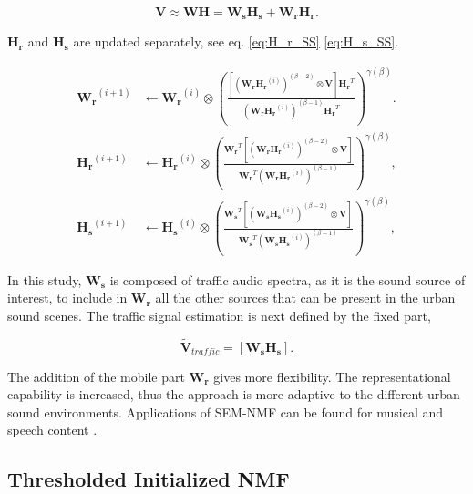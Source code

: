 \documentclass[review,5p,twocolumn,sort&compress,times]{elsarticle}
\begin{document}
\begin{equation}
\mathbf{V} \approx \mathbf{WH} = \mathbf{W_s H_s}+\mathbf{W_r H_r}.
\end{equation}

$\mathbf{H_r}$ and $\mathbf{H_s}$ are updated separately, see eq. \ref{eq:H_r_SS} \ref{eq:H_s_SS}.


{\scriptsize
\begin{subequations}\label{eq:WH-SSupdate}
\begin{align}
\mathbf{W_r}^{(i+1)} &\leftarrow \mathbf{W_r}^{(i)}\otimes\left(\frac{\left[\left(\mathbf{W_r H_r}^{(i)} \right)^{(\beta-2)}\otimes\mathbf{V} \right]\mathbf{H_r}^T}{\left(\mathbf{W_r H_r}^{(i)} \right)^{(\beta-1)}\mathbf{H_r}^T}\right)^{\gamma(\beta)}.\label{eq:W_r_SS}\\
\mathbf{H_r}^{(i+1)} &\leftarrow \mathbf{H_r}^{(i)}\otimes\left(\frac{\mathbf{W_r}^T \left[\left(\mathbf{W_r H_r}^{(i)} \right)^{(\beta-2)}\otimes\mathbf{V} \right]}{\mathbf{W_r}^T \left(\mathbf{W_r H_r}^{(i)} \right)^{(\beta-1)}}\right)^{\gamma(\beta)},\label{eq:H_r_SS}\\
\mathbf{H_s}^{(i+1)} &\leftarrow \mathbf{H_s}^{(i)}\otimes\left(\frac{\mathbf{W_s}^T \left[\left(\mathbf{W_s H_s}^{(i)} \right)^{(\beta-2)}\otimes\mathbf{V} \right]}{\mathbf{W_s}^T \left(\mathbf{W_s H_s}^{(i)} \right)^{(\beta-1)}}\right)^{\gamma(\beta)},\label{eq:H_s_SS}
\end{align}
\end{subequations}}

In this study, $\mathbf{W_s}$ is composed of traffic audio spectra, as it is the sound source of interest, to include in $\mathbf{W_r}$ all the other sources that can be present in the urban sound scenes. The traffic signal estimation is next defined by the fixed part,

\begin{equation}\label{eq:separationExtraction_SS}
\mathbf{\tilde{V}}_{traffic} = \left[ \mathbf{W_s H_s} \right].
\end{equation}

The addition of the mobile part $\mathbf{W_r}$ gives more flexibility. The representational capability is increased, thus the approach is more adaptive to the different urban sound environments. Applications of SEM-NMF can be found for musical \cite{weninger2012supervised, kitamura_music_2014} and speech content \cite{joder2012real, mysore2011non}.

\subsection{Thresholded Initialized NMF}\label{part:NMF_TI}
\end{document}
